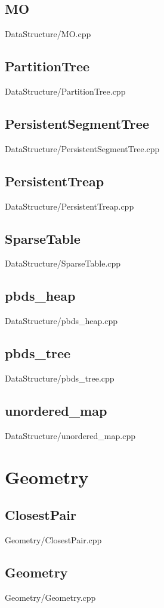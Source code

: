     \subsection{MO}
         {DataStructure/MO.cpp}
    \subsection{PartitionTree}
         {DataStructure/PartitionTree.cpp}
    \subsection{PersistentSegmentTree}
         {DataStructure/PersistentSegmentTree.cpp}
    \subsection{PersistentTreap}
         {DataStructure/PersistentTreap.cpp}
    \subsection{SparseTable}
         {DataStructure/SparseTable.cpp}
    \subsection{pbds\_heap}
         {DataStructure/pbds_heap.cpp}
    \subsection{pbds\_tree}
         {DataStructure/pbds_tree.cpp}
    \subsection{unordered\_map}
         {DataStructure/unordered_map.cpp}


\section{Geometry}
    \subsection{ClosestPair}
         {Geometry/ClosestPair.cpp}
    \subsection{Geometry}
         {Geometry/Geometry.cpp}

